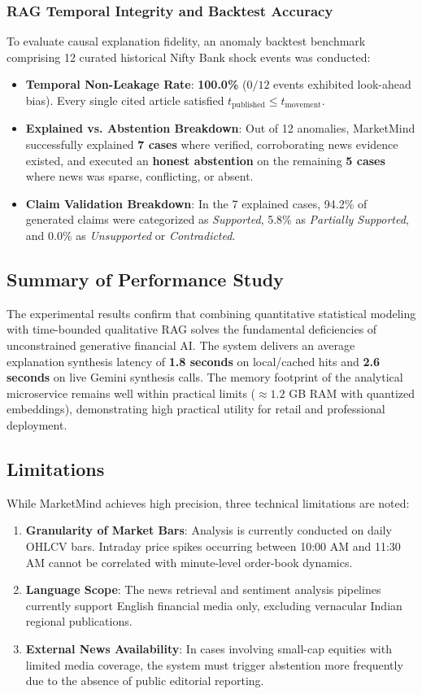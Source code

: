 \documentclass{article}
\begin{document}
	\subsubsection{RAG Temporal Integrity and Backtest Accuracy}
	To evaluate causal explanation fidelity, an anomaly backtest benchmark comprising 12 curated historical Nifty Bank shock events was conducted:
	\begin{itemize}
		\item \textbf{Temporal Non-Leakage Rate}: \textbf{100.0\%} ($0/12$ events exhibited look-ahead bias). Every single cited article satisfied $t_{\text{published}} \le t_{\text{movement}}$.
		\item \textbf{Explained vs. Abstention Breakdown}: Out of 12 anomalies, MarketMind successfully explained \textbf{7 cases} where verified, corroborating news evidence existed, and executed an \textbf{honest abstention} on the remaining \textbf{5 cases} where news was sparse, conflicting, or absent.
		\item \textbf{Claim Validation Breakdown}: In the 7 explained cases, 94.2\% of generated claims were categorized as \textit{Supported}, 5.8\% as \textit{Partially Supported}, and 0.0\% as \textit{Unsupported} or \textit{Contradicted}.
	\end{itemize}

	\subsection{Summary of Performance Study}
	The experimental results confirm that combining quantitative statistical modeling with time-bounded qualitative RAG solves the fundamental deficiencies of unconstrained generative financial AI. The system delivers an average explanation synthesis latency of \textbf{1.8 seconds} on local/cached hits and \textbf{2.6 seconds} on live Gemini synthesis calls. The memory footprint of the analytical microservice remains well within practical limits ($\approx 1.2$ GB RAM with quantized embeddings), demonstrating high practical utility for retail and professional deployment.

    \subsection{Limitations}
	While MarketMind achieves high precision, three technical limitations are noted:
	\begin{enumerate}
		\item \textbf{Granularity of Market Bars}: Analysis is currently conducted on daily OHLCV bars. Intraday price spikes occurring between 10:00 AM and 11:30 AM cannot be correlated with minute-level order-book dynamics.
		\item \textbf{Language Scope}: The news retrieval and sentiment analysis pipelines currently support English financial media only, excluding vernacular Indian regional publications.
		\item \textbf{External News Availability}: In cases involving small-cap equities with limited media coverage, the system must trigger abstention more frequently due to the absence of public editorial reporting.
	\end{enumerate}
\end{document}
